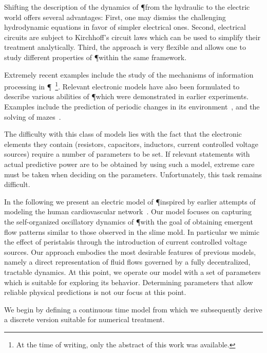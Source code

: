   Shifting the description of the dynamics of \P from the hydraulic to the electric world offers several advantages: First, one may dismiss the challenging hydrodynamic equations in favor of simpler electrical ones. Second, electrical circuits are subject to Kirchhoff's circuit laws which can be used to simplify their treatment analytically. Third, the approach is very flexible and allows one to study different properties of \P within the same framework. 

  Extremely recent examples include the study of the mechanisms of information processing in \P~\cite{tagung2017}\footnote{At the time of writing, only the abstract of this work was available.}. Relevant electronic models have also been formulated to describe various abilities of \P which were demonstrated in earlier experiments. Examples include the prediction of periodic changes in its environment~\cite{pershin2009memristive}, and the solving of mazes~\cite{ntinas2016oscillation}.

  The difficulty with this class of models lies with the fact that the electronic elements they contain (resistors, capacitors, inductors, current controlled voltage sources) require a number of parameters to be set. If relevant statements with actual predictive power are to be obtained by using such a model, extreme care must be taken when deciding on the parameters. Unfortunately, this task remains difficult.

  In the following we present an electric model of \P inspired by earlier attempts of modeling the human cardiovascular network~\cite{stefanovska1999physics,dePater1964}. Our model focuses on capturing the self-organized oscillatory dynamics of \P with the goal of obtaining emergent flow patterns similar to those observed in the slime mold. In particular we mimic the effect of peristalsis through the introduction of current controlled voltage sources. Our approach embodies the most desirable features of previous models, namely a direct representation of fluid flows governed by a fully decentralized, tractable dynamics. 
  At this point, we operate our model with a set of parameters which is suitable for exploring its behavior. Determining parameters that allow reliable physical predictions is not our focus at this point.

  We begin by defining a continuous time model from which we subsequently derive a discrete version suitable for numerical treatment.
